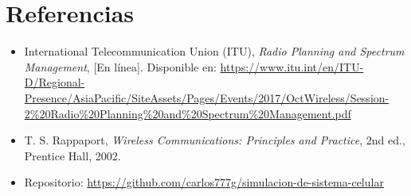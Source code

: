 \section{\Large Referencias}
\begin{itemize}
    \item International Telecommunication Union (ITU), \textit{Radio Planning and Spectrum Management}, [En línea]. Disponible en: \url{https://www.itu.int/en/ITU-D/Regional-Presence/AsiaPacific/SiteAssets/Pages/Events/2017/OctWireless/Session-2%20Radio%20Planning%20and%20Spectrum%20Management.pdf}
    \item T. S. Rappaport, \textit{Wireless Communications: Principles and Practice}, 2nd ed., Prentice Hall, 2002.
    \item Repositorio: \url{https://github.com/carlos777g/simulacion-de-sistema-celular}
\end{itemize}